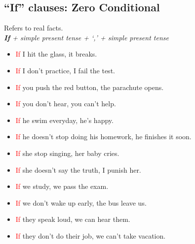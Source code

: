 \subsection{``If'' clauses: Zero Conditional}
\begin{multicols}{2}
Refers to real facts.\\
\emph{\textbf{If} + simple present tense + `,' + simple present tense}
\begin{itemize}
\item \textcolor{red}{If} I hit the glass, it breaks.
\item \textcolor{red}{If} I don't practice, I fail the test.
\item \textcolor{red}{If} you push the red button, the parachute opens.
\item \textcolor{red}{If} you don't hear, you can't help.
\item \textcolor{red}{If} he swim everyday, he's happy.
\item \textcolor{red}{If} he doesn't stop doing his homework, he finishes it soon.
\item \textcolor{red}{If} she stop singing, her baby cries.
\item \textcolor{red}{If} she doesn't say the truth, I punish her.
\item \textcolor{red}{If} we study, we pass the exam.
\item \textcolor{red}{If} we don't wake up early, the bus leave us.
\item \textcolor{red}{If} they speak loud, we can hear them.
\item \textcolor{red}{If} they don't do their job, we can't take vacation.
\end{itemize}
\end{multicols}

